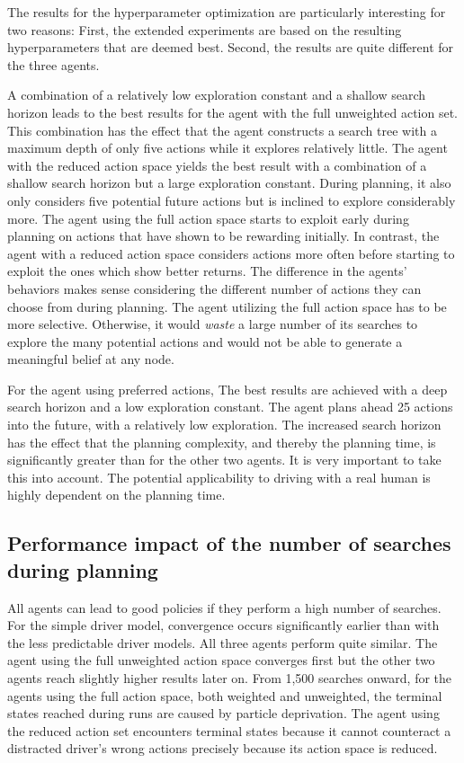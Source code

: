 The results for the hyperparameter optimization are particularly interesting for two reasons: First, the extended experiments are based on the resulting hyperparameters that are deemed best. Second, the results are quite different for the three agents. 

A combination of a relatively low exploration constant and a shallow search horizon leads to the best results for the agent with the full unweighted action set. This combination has the effect that the agent constructs a search tree with a maximum depth of only five actions while it explores relatively little. The agent with the reduced action space yields the best result with a combination of a shallow search horizon but a large exploration constant. During planning, it also only considers five potential future actions but is inclined to explore considerably more. The agent using the full action space starts to exploit early during planning on actions that have shown to be rewarding initially. In contrast, the agent with a reduced action space considers actions more often before starting to exploit the ones which show better returns. The difference in the agents' behaviors makes sense considering the different number of actions they can choose from during planning. The agent utilizing the full action space has to be more selective. Otherwise, it would \emph{waste} a large number of its searches to explore the many potential actions and would not be able to generate a meaningful belief at any node.

For the agent using preferred actions, The best results are achieved with a deep search horizon and a low exploration constant. The agent plans ahead 25 actions into the future, with a relatively low exploration. The increased search horizon has the effect that the planning complexity, and thereby the planning time, is significantly greater than for the other two agents. It is very important to take this into account. The potential applicability to driving with a real human is highly dependent on the planning time.

\subsection{Performance impact of the number of searches during planning}

All agents can lead to good policies if they perform a high number of searches. For the simple driver model, convergence occurs significantly earlier than with the less predictable driver models. All three agents perform quite similar. The agent using the full unweighted action space converges first but the other two agents reach slightly higher results later on. From 1,500 searches onward, for the agents using the full action space, both weighted and unweighted, the terminal states reached during runs are caused by particle deprivation. The agent using the reduced action set encounters terminal states because it cannot counteract a distracted driver's wrong actions precisely because its action space is reduced.

